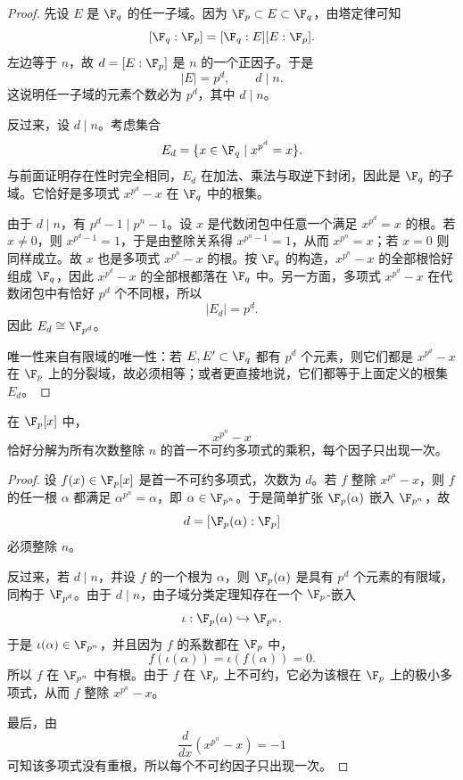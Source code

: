 \begin{proof}
先设 $E$ 是 $\F_q$ 的任一子域。因为 $\F_p\subset E\subset \F_q$，由塔定律可知
\[
[\F_q:\F_p]=[\F_q:E][E:\F_p].
\]
左边等于 $n$，故 $d=[E:\F_p]$ 是 $n$ 的一个正因子。于是
\[
|E|=p^d,
\qquad d\mid n.
\]
这说明任一子域的元素个数必为 $p^d$，其中 $d\mid n$。

反过来，设 $d\mid n$。考虑集合
\[
E_d=\{x\in\F_q\mid x^{p^d}=x\}.
\]
与前面证明存在性时完全相同，$E_d$ 在加法、乘法与取逆下封闭，因此是 $\F_q$ 的子域。它恰好是多项式 $x^{p^d}-x$ 在 $\F_q$ 中的根集。

由于 $d\mid n$，有 $p^d-1\mid p^n-1$。设 $x$ 是代数闭包中任意一个满足 $x^{p^d}=x$ 的根。若 $x\ne0$，则 $x^{p^d-1}=1$，于是由整除关系得 $x^{p^n-1}=1$，从而 $x^{p^n}=x$；若 $x=0$ 则同样成立。故 $x$ 也是多项式 $x^{p^n}-x$ 的根。按 $\F_q$ 的构造，$x^{p^n}-x$ 的全部根恰好组成 $\F_q$，因此 $x^{p^d}-x$ 的全部根都落在 $\F_q$ 中。另一方面，多项式 $x^{p^d}-x$ 在代数闭包中有恰好 $p^d$ 个不同根，所以
\[
|E_d|=p^d.
\]
因此 $E_d\cong \F_{p^d}$。

唯一性来自有限域的唯一性：若 $E,E'\subset\F_q$ 都有 $p^d$ 个元素，则它们都是 $x^{p^d}-x$ 在 $\F_p$ 上的分裂域，故必须相等；或者更直接地说，它们都等于上面定义的根集 $E_d$。
\end{proof}

\begin{proposition}
在 $\F_p[x]$ 中，
\[
x^{p^n}-x
\]
恰好分解为所有次数整除 $n$ 的首一不可约多项式的乘积，每个因子只出现一次。
\end{proposition}

\begin{proof}
设 $f(x)\in\F_p[x]$ 是首一不可约多项式，次数为 $d$。若 $f$ 整除 $x^{p^n}-x$，则 $f$ 的任一根 $\alpha$ 都满足 $\alpha^{p^n}=\alpha$，即 $\alpha\in\F_{p^n}$。于是简单扩张 $\F_p(\alpha)$ 嵌入 $\F_{p^n}$，故
\[
d=[\F_p(\alpha):\F_p]
\]
必须整除 $n$。

反过来，若 $d\mid n$，并设 $f$ 的一个根为 $\alpha$，则 $\F_p(\alpha)$ 是具有 $p^d$ 个元素的有限域，同构于 $\F_{p^d}$。由于 $d\mid n$，由子域分类定理知存在一个 $\F_p$-嵌入
\[
\iota:\F_p(\alpha)\hookrightarrow \F_{p^n}.
\]
于是 $\iota(\alpha)\in\F_{p^n}$，并且因为 $f$ 的系数都在 $\F_p$ 中，
\[
f(\iota(\alpha))=\iota(f(\alpha))=0.
\]
所以 $f$ 在 $\F_{p^n}$ 中有根。由于 $f$ 在 $\F_p$ 上不可约，它必为该根在 $\F_p$ 上的极小多项式，从而 $f$ 整除 $x^{p^n}-x$。

最后，由
\[
\frac{d}{dx}(x^{p^n}-x)=-1
\]
可知该多项式没有重根，所以每个不可约因子只出现一次。
\end{proof}


